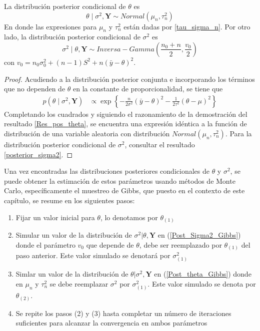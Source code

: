 \documentclass[10pt,openright]{book}\usepackage[]{graphicx}\usepackage[]{color}
\begin{document}
\begin{Res}
La distribuci\'on posterior condicional de $\theta$ es
\begin{equation}\label{Post_theta_Gibbs}
\theta  \mid  \sigma^2,\mathbf{Y} \sim Normal(\mu_n,\tau_n^2)
\end{equation}
En donde las expresiones para $\mu_n$ y $\tau_n^2$ est\'an dadas por \ref{tau_sigma_n}. Por otro lado, la distribuci\'on posterior condicional de $\sigma^2$ es 
\begin{equation}\label{Post_Sigma2_Gibbs}
\sigma^2  \mid  \theta,\mathbf{Y} \sim Inversa-Gamma\left(\dfrac{n_0+n}{2},\dfrac{v_0}{2}\right)
\end{equation}
con $v_0=n_0\sigma^2_0+(n-1)S^2+n(\bar{y}-\theta)^2$.
\end{Res}

\begin{proof}
Acudiendo a la distribuci\'on posterior conjunta e incorporando los t\'erminos que no dependen de $\theta$ en la constante de proporcionalidad, se tiene que
\begin{align*}
p(\theta \mid \sigma^2,\mathbf{Y})&\propto \exp\left\{-\frac{n}{2\sigma^2}(\bar{y}-\theta)^2-\frac{1}{2\tau^2}(\theta-\mu)^2\right\}
\end{align*}
Completando los cuadrados y siguiendo el razonamiento de la demostraci\'on del resultado \ref{Res_pos_theta}, se encuentra una expresi\'on id\'entica a la funci\'on de distribuci\'on de una variable aleatoria con distribuci\'on $Normal(\mu_n, \tau^2_n)$. Para la distribuci\'on posterior condicional de $\sigma^2$, consultar el resultado \ref{posterior_sigma2}.
\end{proof}

Una vez encontradas las distribuciones posteriores condicionales de $\theta$ y $\sigma^2$, se puede obtener la estimaci\'on de estos par\'ametros usando m\'etodos de Monte Carlo, espec\'ificamente el muestreo de Gibbs, que puesto en el contexto de este cap\'itulo, se resume en los siguientes pasos:
\begin{enumerate}[(1)]
\item Fijar un valor inicial para $\theta$, lo denotamos por $\theta_{(1)}$
\item Simular un valor de la distribuci\'on de $\sigma^2|\theta,\mathbf{Y}$ en (\ref{Post_Sigma2_Gibbs}) donde el par\'ametro $v_0$ que depende de $\theta$, debe ser reemplazado por $\theta_{(1)}$ del paso anterior. Este valor simulado se denotar\'a por $\sigma^2_{(1)}$
\item  Simlar un valor de la distribuci\'on de $\theta|\sigma^2,\mathbf{Y}$ en (\ref{Post_theta_Gibbs}) donde en $\mu_n$ y $\tau^2_n$ se debe reemplazar $\sigma^2$ por $\sigma^2_{(1)}$. Este valor simulado se denota por $\theta_{(2)}$.
\item Se repite los pasos (2) y (3) hasta completar un n\'umero de iteraciones suficientes para alcanzar la convergencia en ambos par\'ametros
\end{enumerate}
\end{document}

